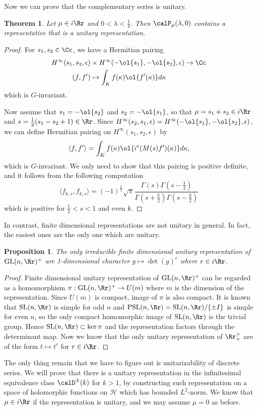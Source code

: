 \documentclass{article}
\newtheorem{theorem}{Theorem}[section]
\newcommand{\GL}{\mathrm{GL}}
\newcommand{\SL}{\mathrm{SL}}
\newtheorem{proposition}{Proposition}[section]
\begin{document}
Now we can prove that the complementary series is unitary. 
\begin{theorem}
Let $\mu\in i\Rr$ and $0<\lambda < \frac{1}{4}$. Then $\calP_{\mu}(\lambda, 0)$ contains a representative that is a unitary representation. 
\end{theorem}
\begin{proof}
For $s_{1}, s_{2}\in \Cc$, we have a Hermitian pairing 
\begin{align*}
H^{\infty}(s_{1}, s_{2}, \epsilon) &\times H^{\infty}(-\ol{s_{1}}, -\ol{s_{2}}, \epsilon) \to \Cc \\
(f, f')&\mapsto \int_{K} f(\kappa) \ol{f'(\kappa)} d\kappa
\end{align*}
which is $G$-invariant. 

Now assume that $s_{1} = -\ol{s_{2}}$ and $s_{2} = -\ol{s_{1}}$, so that $\mu = s_{1} + s_{2} \in i\Rr$ and $s = \frac{1}{2}(s_{1} - s_{2} + 1)\in \Rr$. Since $H^{\infty}(s_{2}, s_{1}, \epsilon) = H^{\infty} (-\ol{s_{1}}, -\ol{s_{2}}, \epsilon)$, we can define Hermitian pairing on $H^{\infty}(s_{1}, s_{2}, \epsilon)$ by 
$$
\langle f, f'\rangle = \int_{K} f(\kappa)\ol{i^{\epsilon}(M(s)f')(\kappa)}d\kappa, 
$$
which is $G$-invariant. We only need to show that this pairing is positive definite, and it follows from the following computation
$$
\langle f_{k, s}, f_{k, s}\rangle = (-1)^{\frac{k}{2}} \sqrt{\pi} \frac{\Gamma(s)\Gamma\left(s-\frac{1}{2}\right)}{\Gamma\left(s+\frac{k}{2}\right)\Gamma\left(s-\frac{k}{2}\right)}
$$
which is positive for $\frac{1}{2} <s < 1$ and even $k$. 
\end{proof}

In contrast, finite dimensional representations are not unitary in general. In fact, the easiest ones are the only one which are unitary. 
\begin{proposition}
The only irreducible finite dimensional unitary representation of $\GL(n, \Rr)^{+}$ are 1-dimensional character $g\mapsto \det(g)^{r}$ where $r\in i\Rr$. 
\end{proposition}
\begin{proof}
Finite dimensional unitary representation of $\GL(n, \Rr)^{+}$ can be regarded as a homomorphism $\pi:\GL(n, \Rr)^{+}\to U(m)$ where $m$ is the dimension of the representation. Since $U(m)$ is compact, image of $\pi$ is also compact. It is known that $\SL(n, \Rr)$  is simple for odd $n$ and $\mathrm{PSL}(n, \Rr) = \SL(n, \Rr)/\{\pm I\}$ is simple for even $n$, so the only compact homomorphic image of $\SL(n, \Rr)$ is the trivial group. 
Hence $\SL(n, \Rr)\subset \ker\pi$ and the representation factors through the determinant map. Now we know that the only unitary representation of $\Rr_{+}^{\times}$ are of the form $t\mapsto t^{r}$ for $r\in i\Rr$. 
\end{proof}
The only thing remain that we have to figure out is unitarizability of discrete series. We will prove that there is a unitary representation in the infinitesimal equivalence class $\calD^{\pm}(k)$ for $k>1$, by constructing such representation on a space of holomorphic functions on $\mathcal{H}$ which has bounded $L^{2}$-norm. 
We know that $\mu\in i\Rr$ if the representation is unitary, and we may assume $\mu = 0$ as before. 
\end{document}
